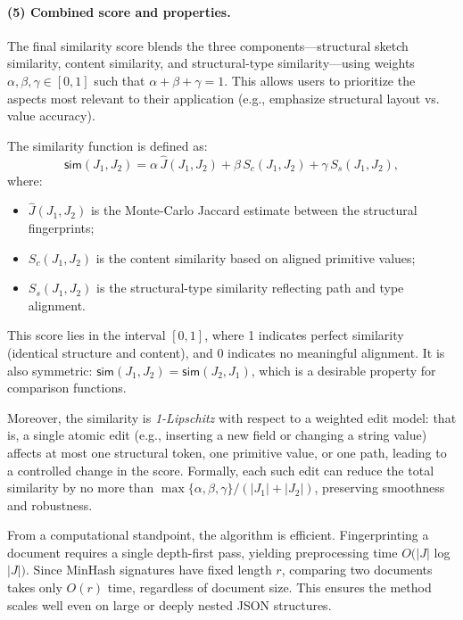 \documentclass[sigconf]{acmart}
\begin{document}
\paragraph{(5) Combined score and properties.}
The final similarity score blends the three components—structural sketch similarity, content similarity, and structural-type similarity—using weights \(\alpha, \beta, \gamma \in [0,1]\) such that \(\alpha + \beta + \gamma = 1\).  
This allows users to prioritize the aspects most relevant to their application (e.g., emphasize structural layout vs. value accuracy).

The similarity function is defined as:
\[
  \mathsf{sim}(J_1, J_2)
  = \alpha\, \widehat{J}(J_1, J_2)
  + \beta\, S_c(J_1, J_2)
  + \gamma\, S_s(J_1, J_2),
\]
where:
\begin{itemize}
  \item \(\widehat{J}(J_1, J_2)\) is the Monte-Carlo Jaccard estimate between the structural fingerprints;
  \item \(S_c(J_1, J_2)\) is the content similarity based on aligned primitive values;
  \item \(S_s(J_1, J_2)\) is the structural-type similarity reflecting path and type alignment.
\end{itemize}

This score lies in the interval \([0,1]\), where 1 indicates perfect similarity (identical structure and content), and 0 indicates no meaningful alignment.  
It is also symmetric: \(\mathsf{sim}(J_1, J_2) = \mathsf{sim}(J_2, J_1)\), which is a desirable property for comparison functions.

Moreover, the similarity is \emph{1-Lipschitz} with respect to a weighted edit model: that is, a single atomic edit (e.g., inserting a new field or changing a string value) affects at most one structural token, one primitive value, or one path, leading to a controlled change in the score.  
Formally, each such edit can reduce the total similarity by no more than \(\max\{\alpha, \beta, \gamma\} / (\lvert J_1 \rvert + \lvert J_2 \rvert)\), preserving smoothness and robustness.

From a computational standpoint, the algorithm is efficient.  
Fingerprinting a document requires a single depth-first pass, yielding preprocessing time $O(\lvert J \rvert$ log $\lvert J \rvert)$.  
Since MinHash signatures have fixed length \(r\), comparing two documents takes only \(O(r)\) time, regardless of document size.  
This ensures the method scales well even on large or deeply nested JSON structures.
\end{document}
